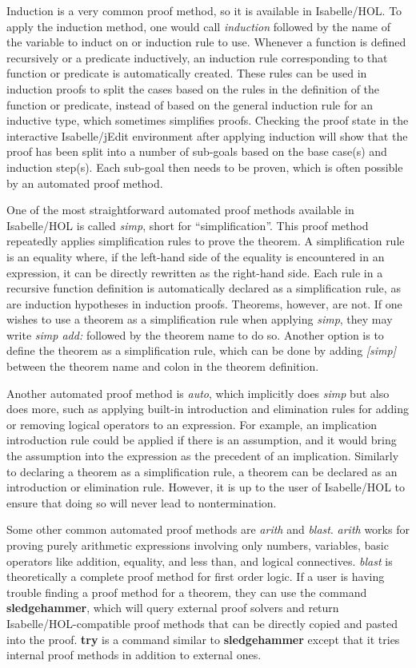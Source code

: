 \documentclass{article}
\begin{document}
Induction is a very common proof method, so it is available in Isabelle/HOL. To 
apply the induction method, one would call \textit{induction} followed by the 
name of the variable to induct on or induction rule to use. Whenever a function 
is defined recursively or a predicate inductively, an induction rule 
corresponding to that function or predicate is automatically created. These 
rules can be used in induction proofs to split the cases based on the rules in 
the definition of the function or predicate, instead of based on the general 
induction rule for an inductive type, which sometimes simplifies proofs. 
Checking the proof state in the interactive Isabelle/jEdit environment after 
applying induction will show that the proof has been split into a number of 
sub-goals based on the base case(s) and induction step(s). Each sub-goal then 
needs to be proven, which is often possible by an automated proof method.

One of the most straightforward automated proof methods available in 
Isabelle/HOL is called \textit{simp}, short for ``simplification''. This proof 
method repeatedly applies simplification rules to prove the theorem. A 
simplification rule is an equality where, if the left-hand side of the equality 
is encountered in an expression, it can be directly rewritten as the right-hand 
side. Each rule in a recursive function definition is automatically declared as 
a simplification rule, as are induction hypotheses in induction proofs. 
Theorems, however, are not. If one wishes to use a theorem as a simplification 
rule when applying \textit{simp}, they may write \textit{simp add:} followed by 
the theorem name to do so. Another option is to define the theorem as a 
simplification rule, which can be done by adding \textit{[simp]} between the 
theorem name and colon in the theorem definition.

Another automated proof method is \textit{auto}, which implicitly does 
\textit{simp} but also does more, such as applying built-in introduction and 
elimination rules for adding or removing logical operators to an expression. 
For example, an implication introduction rule could be applied if there is an 
assumption, and it would bring the assumption into the expression as the 
precedent of an implication. Similarly to declaring a theorem as a 
simplification rule, a theorem can be declared as an introduction or 
elimination rule. However, it is up to the user of Isabelle/HOL to ensure that 
doing so will never lead to nontermination.

Some other common automated proof methods are \textit{arith} and 
\textit{blast}. \textit{arith} works for proving purely arithmetic expressions 
involving only numbers, variables, basic operators like addition, equality, and 
less than, and logical connectives. \textit{blast} is theoretically a complete 
proof method for first order logic. If a user is having trouble finding a proof 
method for a theorem, they can use the command \textbf{sledgehammer}, which 
will query external proof solvers and return Isabelle/HOL-compatible proof 
methods that can be directly copied and pasted into the proof. \textbf{try} is 
a command similar to \textbf{sledgehammer} except that it tries internal proof 
methods in addition to external ones.

\newpage

\nocite{*}




\end{document}
